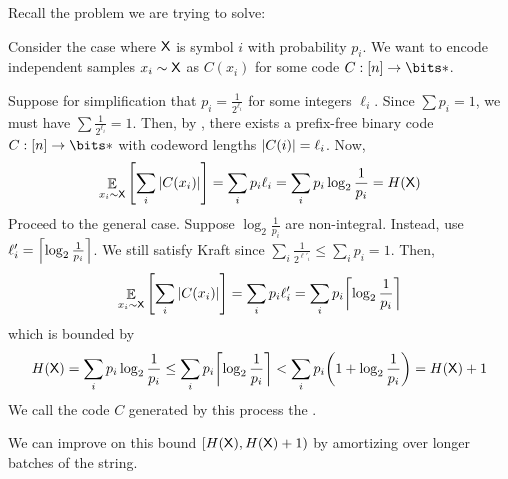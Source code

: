 \documentclass[class=co432,notes,tikz]{agony}
\DeclareMathOperator*{\E}{\mathbb{E}}
\begin{document}
Recall the problem we are trying to solve:
\bitproblem*
\begin{sol}
  Consider the case where $\rv X$ is symbol $i$ with probability $p_i$.
  We want to encode independent samples $x_i \sim \rv X$
  as $C(x_i)$ for some code $C : [n] \to \bits*$.

  Suppose for simplification that $p_i = \frac{1}{2^{\ell_i}}$
  for some integers $\ell_i$.
  Since $\sum p_i = 1$, we must have $\sum \frac{1}{2^{\ell_i}} = 1$.
  Then, by , there exists a prefix-free binary code
  $C : [n] \to \bits*$ with codeword lengths $\abs{C(i)} = \ell_i$.
  Now,
  \[
    \E_{x_i \sim \rv X}\qty[\sum_i\abs{C(x_i)}] = \sum_i p_i\ell_i = \sum_i p_i\log_2\frac{1}{p_i} = H(\rv X)
  \]
  Proceed to the general case.
  Suppose $\log_2\frac{1}{p_i}$ are non-integral.
  Instead, use $\ell'_i = \ceil*{\log_2\frac{1}{p_i}}$.
  We still satisfy Kraft since $\sum_i \frac{1}{2^{\ell'_i}} \leq \sum_i p_i = 1$.
  Then,
  \[
    \E_{x_i \sim \rv X}\qty[\sum_i\abs{C(x_i)}] = \sum_i p_i\ell'_i = \sum_i p_i\ceil*{\log_2\frac{1}{p_i}}
  \]
  which is bounded by
  \[ H(\rv X) = \sum_i p_i\log_2\frac{1}{p_i} \leq \sum_i p_i\ceil*{\log_2\frac{1}{p_i}} < \sum_i p_i\qty(1+\log_2\frac{1}{p_i}) = H(\rv X) + 1 \]
  We call the code $C$ generated by this process the .
\end{sol}

We can improve on this bound $[H(\rv X), H(\rv X) + 1)$
by amortizing over longer batches of the string.
\end{document}
